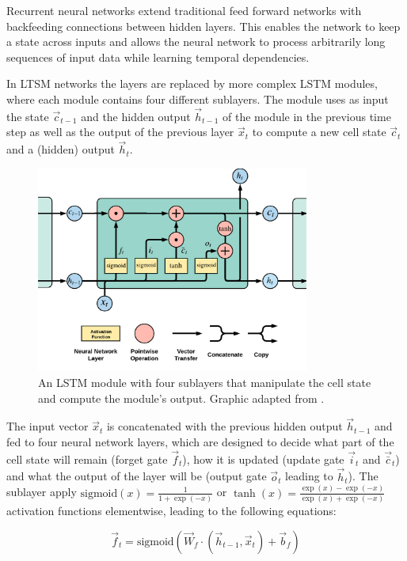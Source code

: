 Recurrent neural networks extend traditional feed forward networks with backfeeding connections between hidden layers.
This enables the network to keep a state across inputs and allows the neural network to process arbitrarily long sequences of input data while learning temporal dependencies.

In LTSM networks the layers are replaced by more complex LSTM modules, where each module contains four different sublayers.
The module uses as input the state $\vec{c}_{t-1}$ and the hidden output $\vec{h}_{t-1}$ of the module in the previous time step as well as the output of the previous layer $\vec{x}_t$ to compute a new cell state $\vec{c}_{t}$ and a (hidden) output $\vec{h}_{t}$.

\begin{figure}[htbp!]
	\centering
	\includegraphics[width=0.8\textwidth]{figures/lstm-module}
	\caption{An LSTM module with four sublayers that manipulate the cell state and compute the module's output. Graphic adapted from \cite{lstm-blog}.}
	\label{fig:lstm-module}
\end{figure}


The input vector $\vec{x}_t$ is concatenated with the previous hidden output $\vec{h}_{t-1}$ and fed to four neural network layers, which are designed to decide what part of the cell state will remain (forget gate $\vec{f}_t$), how it is updated (update gate $\vec{i}_t$ and $\vec{\bar{c}}_t$) and what the output of the layer will be (output gate $\vec{o}_t$ leading to $\vec{h}_t$).
The sublayer apply $\text{sigmoid}(x) = \frac{1}{1+\exp({-x})}$ or $\tanh(x) = \frac{\exp({x}) - \exp({-x})}{\exp({x}) + \exp({-x})}$ activation functions elementwise, leading to the following equations:

\begin{equation*}
	\vec{f}_t = \text{sigmoid}(\vec{W}_f \cdot (\vec{h}_{t-1}, \vec{x}_t) + \vec{b}_f)
\end{equation*}

